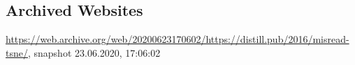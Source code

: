 \begin{appendices}





	


\section{Archived Websites}
\sloppy
\url{https://web.archive.org/web/20200623170602/https://distill.pub/2016/misread-tsne/}, snapshot 23.06.2020, 17:06:02


\end{appendices}
